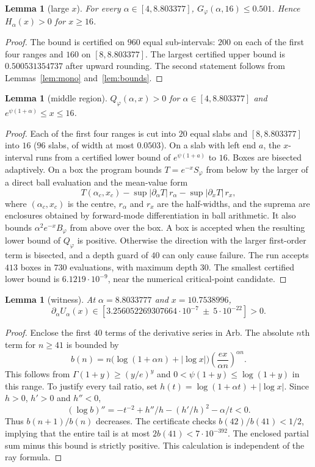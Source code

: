 \documentclass[11pt,a4paper]{article}
\theoremstyle{plain}
\newtheorem{lemma}[theorem]{Lemma}
\theoremstyle{remark}
\begin{document}
\begin{lemma}[large $x$]\label{lem:tail16}
For every $\alpha\in[4,8.803377]$, $G_\varphi(\alpha,16)\le0.501$. Hence $H_\alpha(x)>0$ for
$x\ge16$.
\end{lemma}
\begin{proof}
The bound is certified on $960$ equal sub-intervals: $200$ on each of the first four ranges and
$160$ on $[8,8.803377]$. The largest certified upper bound is $0.500531354737$ after upward rounding. The second statement
follows from Lemmas~\ref{lem:mono} and~\ref{lem:bounds}.
\end{proof}

\begin{lemma}[middle region]\label{lem:middle}
$Q_\varphi(\alpha,x)>0$ for $\alpha\in[4,8.803377]$ and $e^{\psi(1+\alpha)}\le x\le16$.
\end{lemma}
\begin{proof}
Each of the first four ranges is cut into $20$ equal slabs and $[8,8.803377]$ into $16$ ($96$
slabs, of width at most $0.0503$). On a slab with left end
$a$, the $x$-interval runs from a certified lower bound of $e^{\psi(1+a)}$ to $16$. Boxes are
bisected adaptively. On a box the program bounds $T=e^{-x}S_\varphi$ from below by the larger of a
direct ball evaluation and the mean-value form
\[
 T(\alpha_c,x_c)-\sup|\partial_\alpha T|\,r_\alpha-\sup|\partial_xT|\,r_x ,
\]
where $(\alpha_c,x_c)$ is the centre, $r_\alpha$ and $r_x$ are the half-widths, and the suprema are
enclosures obtained by forward-mode differentiation in ball arithmetic. It also bounds
$\alpha^2e^{-x}B_\varphi$ from above over the box. A box is accepted when the resulting lower bound
of $Q_\varphi$ is positive. Otherwise the direction with the larger first-order term is bisected,
and a depth guard of $40$ can only cause failure. The run accepts $413$ boxes in $730$
evaluations, with maximum depth $30$. The smallest certified lower bound is $6.1219\cdot10^{-9}$, near the numerical critical-point candidate.
\end{proof}

\begin{lemma}[witness]\label{lem:witness}
At $\alpha=8.8033777$ and $x=10.7538996$,
\[
 \partial_\alpha U_\alpha(x)
 \in[3.256052269307664\cdot10^{-7}\ \mathbin{\pm}\ 5\cdot10^{-22}]>0.
\]
\end{lemma}
\begin{proof}
Enclose the first $40$ terms of the derivative series in Arb. The absolute
$n$th term for $n\ge41$ is bounded by
\[
 b(n)=n\bigl(\log(1+\alpha n)+|\log x|\bigr)
       \left(\frac{ex}{\alpha n}\right)^{\alpha n}.
\]
This follows from $\Gamma(1+y)\ge(y/e)^y$ and
$0<\psi(1+y)\le\log(1+y)$ in this range. To justify every tail ratio,
set $h(t)=\log(1+\alpha t)+|\log x|$. Since $h>0$, $h'>0$ and $h''<0$,
\[
 (\log b)''=-t^{-2}+h''/h-(h'/h)^2-\alpha/t<0.
\]
Thus $b(n+1)/b(n)$ decreases. The certificate checks
$b(42)/b(41)<1/2$, implying that the entire tail is at most
$2b(41)<7\cdot10^{-392}$. The enclosed partial sum minus this bound is
strictly positive. This calculation is independent of the ray formula.
\end{proof}
\end{document}
